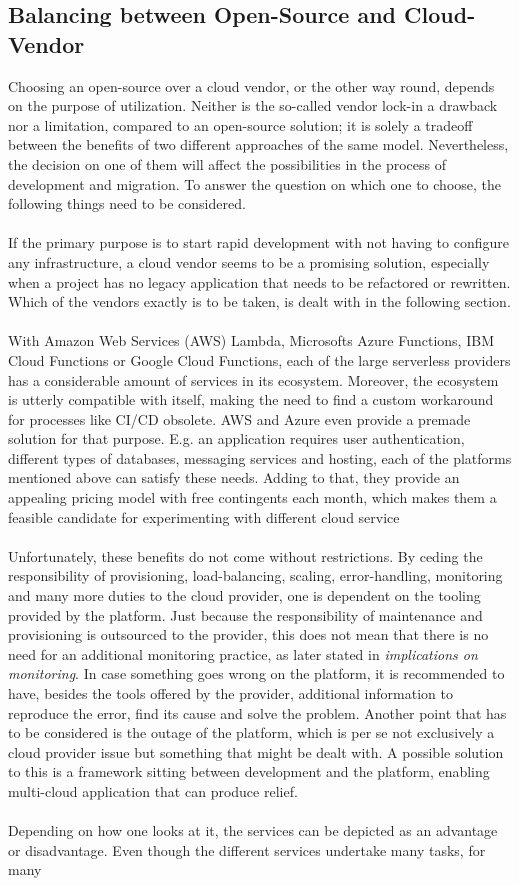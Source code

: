 \documentclass[11pt]{article}
\begin{document}
\subsection{Balancing between Open-Source and Cloud-Vendor}
Choosing an open-source over a cloud vendor, or the other way round, depends on the purpose of utilization. Neither is the so-called vendor lock-in a drawback nor a limitation, compared to an open-source solution; it is solely a tradeoff between the benefits of two different approaches of the same model. Nevertheless, the decision on one of them will affect the possibilities in the process of development and migration. To answer the question on which one to choose, the following things need to be considered.\\\\If the primary purpose is to start rapid development with not having to configure any infrastructure, a cloud vendor seems to be a promising solution, especially when a project has no legacy application that needs to be refactored or rewritten. Which of the vendors exactly is to be taken, is dealt with in the following section.\\\\With Amazon Web Services (AWS) Lambda, Microsofts Azure Functions, IBM Cloud Functions or Google Cloud Functions, each of the large serverless providers has a considerable amount of services in its ecosystem. Moreover, the ecosystem is utterly compatible with itself, making the need to find a custom workaround for processes like CI/CD obsolete. AWS and Azure even provide a premade solution for that purpose. E.g. an application requires user authentication, different types of databases, messaging services and hosting, each of the platforms mentioned above can satisfy these needs. Adding to that, they provide an appealing pricing model with free contingents each month, which makes them a feasible candidate for experimenting with different cloud service \\\\Unfortunately, these benefits do not come without restrictions. By ceding the responsibility of provisioning, load-balancing, scaling, error-handling, monitoring and many more duties to the cloud provider, one is dependent on the tooling provided by the platform. Just because the responsibility of maintenance and provisioning is outsourced to the provider, this does not mean that there is no need for an additional monitoring practice, as later stated in \textit{implications on monitoring}. In case something goes wrong on the platform, it is recommended to have, besides the tools offered by the provider, additional information to reproduce the error, find its cause and solve the problem. Another point that has to be considered is the outage of the platform, which is per se not exclusively a cloud provider issue but something that might be dealt with. A possible solution to this is a framework sitting between development and the platform, enabling multi-cloud application that can produce relief.\\\\ Depending on how one looks at it, the services can be depicted as an advantage or disadvantage. Even though the different services undertake many tasks, for many 
\end{document}
